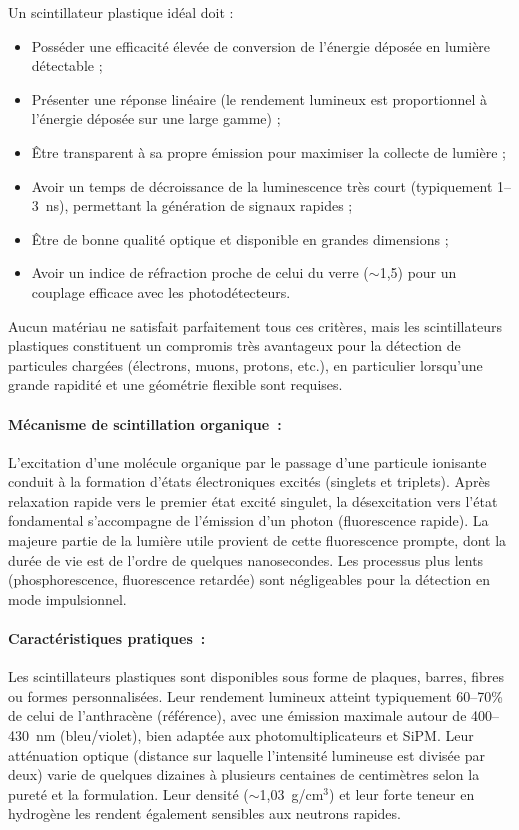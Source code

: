 \documentclass[a4paper,12pt,twoside]{article}
\begin{document}
Un scintillateur plastique idéal doit :
\begin{itemize}
    \item Posséder une efficacité élevée de conversion de l'énergie déposée en lumière détectable ;
    \item Présenter une réponse linéaire (le rendement lumineux est proportionnel à l'énergie déposée sur une large gamme) ;
    \item Être transparent à sa propre émission pour maximiser la collecte de lumière ;
    \item Avoir un temps de décroissance de la luminescence très court (typiquement 1--3~ns), permettant la génération de signaux rapides ;
    \item Être de bonne qualité optique et disponible en grandes dimensions ;
    \item Avoir un indice de réfraction proche de celui du verre ($\sim$1,5) pour un couplage efficace avec les photodétecteurs.
\end{itemize}
Aucun matériau ne satisfait parfaitement tous ces critères, mais les scintillateurs plastiques constituent un compromis très avantageux pour la détection de particules chargées (électrons, muons, protons, etc.), en particulier lorsqu'une grande rapidité et une géométrie flexible sont requises.

\paragraph{Mécanisme de scintillation organique~:} L'excitation d'une molécule organique par le passage d'une particule ionisante conduit à la formation d'états électroniques excités (singlets et triplets). Après relaxation rapide vers le premier état excité singulet, la désexcitation vers l'état fondamental s'accompagne de l'émission d'un photon (fluorescence rapide). La majeure partie de la lumière utile provient de cette fluorescence prompte, dont la durée de vie est de l'ordre de quelques nanosecondes. Les processus plus lents (phosphorescence, fluorescence retardée) sont négligeables pour la détection en mode impulsionnel.

\paragraph{Caractéristiques pratiques~:} Les scintillateurs plastiques sont disponibles sous forme de plaques, barres, fibres ou formes personnalisées. Leur rendement lumineux atteint typiquement 60--70\% de celui de l'anthracène (référence), avec une émission maximale autour de 400--430~nm (bleu/violet), bien adaptée aux photomultiplicateurs et SiPM. Leur atténuation optique (distance sur laquelle l'intensité lumineuse est divisée par deux) varie de quelques dizaines à plusieurs centaines de centimètres selon la pureté et la formulation. Leur densité ($\sim$1,03~g/cm$^3$) et leur forte teneur en hydrogène les rendent également sensibles aux neutrons rapides.
\end{document}
